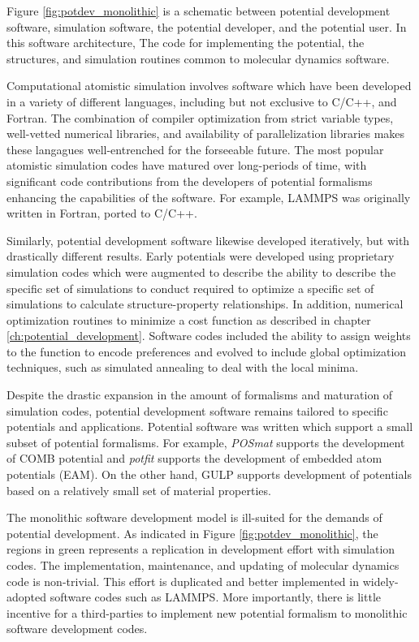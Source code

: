 Figure \ref{fig:potdev_monolithic} is a schematic between potential development software, simulation software, the potential developer, and the potential user.  In this software architecture, The code for implementing the potential, the structures, and simulation routines common to molecular dynamics software.

Computational atomistic simulation involves software which have been developed in a variety of different languages, including but not exclusive to C/C++, and Fortran.  The combination of compiler optimization from strict variable types, well-vetted numerical libraries, and availability of parallelization libraries makes these langagues well-entrenched for the forseeable future.  The most popular atomistic simulation codes have matured over long-periods of time, with significant code contributions from the developers of potential formalisms enhancing the capabilities of the software.  For example, LAMMPS was originally written in Fortran, ported to C/C++.

Similarly, potential development software likewise developed iteratively, but with drastically different results.  Early potentials were developed using proprietary simulation codes which were augmented to describe the ability to describe the specific set of simulations to conduct required to optimize a specific set of simulations to calculate structure-property relationships.   In addition, numerical optimization routines to minimize a cost function as described in chapter \ref{ch:potential_development}.  Software codes included the ability to assign weights to the function to encode preferences and evolved to include global optimization techniques, such as simulated annealing\cite{kirkpatrick1983_simmulated_annealing} to deal with the local minima.

Despite the drastic expansion in the amount of formalisms and maturation of simulation codes, potential development software remains tailored to specific potentials and applications.  Potential software was written which support a small subset of potential formalisms.  For example, \emph{POSmat}\cite{martinez2016_posmat} supports the development of COMB potential and \emph{potfit}\cite{brommer2015_potfit} supports the development of embedded atom potentials (EAM).  On the other hand, GULP supports development of potentials based on a relatively small set of material properties.

The monolithic software development model is ill-suited for the demands of potential development.  As indicated in Figure \ref{fig:potdev_monolithic}, the regions in green represents a replication in development effort with simulation codes.  The implementation, maintenance, and updating of molecular dynamics code is non-trivial.  This effort is duplicated and better implemented in widely-adopted software codes such as LAMMPS.  More importantly,  there is little incentive for a third-parties to implement new potential formalism to monolithic software development codes.

